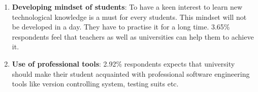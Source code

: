 \begin{enumerate}
    
    
    \item \textbf{Developing mindset of students}: To have a keen interest to learn new technological knowledge is a must for every students. This mindset will not be developed in a day. They have to practise it for a long time. 3.65\% respondents feel that teachers as well as universities can help them to achieve it.
    
    
    
    \item \textbf{Use of professional tools}: 2.92\% respondents expects that university should make their student acquainted with professional software engineering tools like version controlling system, testing suits etc.
    
\end{enumerate}


